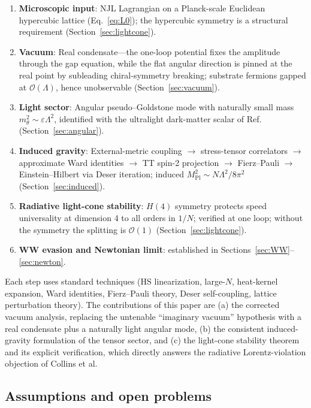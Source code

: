 \documentclass[11pt,a4paper]{article}
\begin{document}
\begin{enumerate}
\item \textbf{Microscopic input}: NJL Lagrangian on a Planck-scale
  Euclidean hypercubic lattice (Eq.~\ref{eq:L0}); the hypercubic
  symmetry is a structural requirement
  (Section~\ref{sec:lightcone}).
\item \textbf{Vacuum}: Real condensate---the one-loop potential
  fixes the amplitude through the gap equation, while the flat
  angular direction is pinned at the real point by subleading
  chiral-symmetry breaking; substrate fermions gapped at
  $\mathcal{O}(\Lambda)$, hence unobservable
  (Section~\ref{sec:vacuum}).
\item \textbf{Light sector}: Angular pseudo--Goldstone mode with
  naturally small mass $m_\theta^2 \sim \varepsilon\Lambda^2$,
  identified with the ultralight dark-matter scalar of
  Ref.~\cite{Cheng:2025sparc} (Section~\ref{sec:angular}).
\item \textbf{Induced gravity}: External-metric coupling
  $\to$ stress-tensor correlators $\to$ approximate Ward identities
  $\to$ TT spin-2 projection $\to$ Fierz--Pauli $\to$
  Einstein--Hilbert via Deser iteration; induced
  $M_{\mathrm{Pl}}^2 \sim N\Lambda^2/8\pi^2$
  (Section~\ref{sec:induced}).
\item \textbf{Radiative light-cone stability}: $H(4)$ symmetry
  protects speed universality at dimension 4 to all orders in
  $1/N$; verified at one loop; without the symmetry the splitting
  is $\mathcal{O}(1)$ (Section~\ref{sec:lightcone}).
\item \textbf{WW evasion and Newtonian limit}: established in
  Sections~\ref{sec:WW}--\ref{sec:newton}.
\end{enumerate}

Each step uses standard techniques (HS linearization, large-$N$,
heat-kernel expansion, Ward identities, Fierz--Pauli theory, Deser
self-coupling, lattice perturbation theory).
The contributions of this paper are
(a) the corrected vacuum analysis, replacing the untenable
``imaginary vacuum'' hypothesis with a real condensate plus a
naturally light angular mode,
(b) the consistent induced-gravity formulation of the tensor
sector, and
(c) the light-cone stability theorem and its explicit verification,
which directly answers the radiative Lorentz-violation objection of
Collins et al.

\subsection{Assumptions and open problems}
\end{document}
